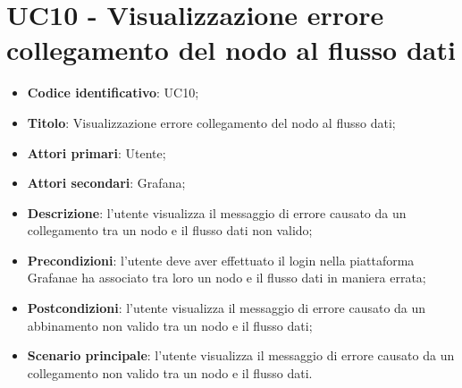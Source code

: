 \section{UC10 - Visualizzazione errore collegamento del nodo al flusso dati}
\begin{itemize}
    \item \textbf{Codice identificativo}: UC10;
    \item \textbf{Titolo}: Visualizzazione errore collegamento del nodo al flusso dati;
    \item \textbf{Attori primari}: Utente;
    \item \textbf{Attori secondari}: Grafana\glo;
    \item \textbf{Descrizione}: l'utente visualizza il messaggio di errore causato da un collegamento tra un nodo e il flusso dati non valido;
    \item \textbf{Precondizioni}: l'utente deve aver effettuato il login nella piattaforma Grafana\glo e ha associato tra loro un nodo e il flusso dati in maniera errata;
    \item \textbf{Postcondizioni}: l'utente visualizza il messaggio di errore causato da un abbinamento non valido tra un nodo e il flusso dati;
    \item \textbf{Scenario principale}: l'utente visualizza il messaggio di errore causato da un collegamento non valido tra un nodo e il flusso dati.
\end{itemize}